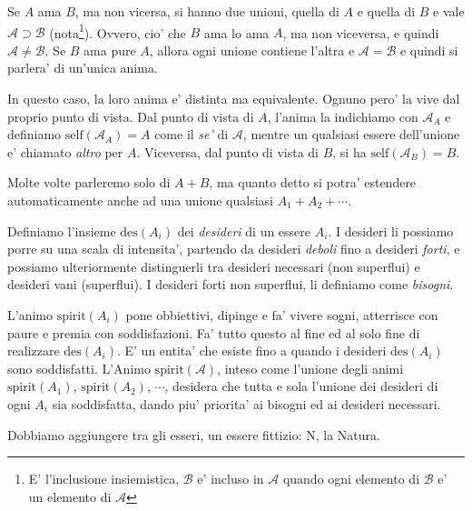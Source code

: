 Se $A$ ama $B$, ma non vicersa, si hanno due unioni, quella di $A$ e quella di $B$ e vale $\mathcal{A} \supset \mathcal{B}$ (nota\footnote{E' l'inclusione insiemistica, $\mathcal{B}$ e' incluso in $\mathcal{A}$ quando ogni elemento di $\mathcal{B}$ e' un elemento di $\mathcal{A}$}).  Ovvero, cio' che $B$ ama lo ama $A$, ma non viceversa, e quindi $\mathcal{A} \neq \mathcal{B}$. Se $B$ ama pure $A$, allora ogni unione contiene l'altra e $\mathcal{A} = \mathcal{B}$ e quindi si parlera' di un'unica anima. 

In questo caso, la loro anima e' distinta ma equivalente.  Ognuno pero' la vive dal proprio punto di vista. Dal punto di vista di $A$, l'anima la indichiamo con $\mathcal{A}_A$ e definiamo $\textrm{self}(\mathcal{A}_A)=A$ come il \emph{se'} di $\mathcal{A}$, mentre un qualsiasi essere dell'unione e' chiamato \emph{altro} per $A$. Viceversa, dal punto di vista di $B$, si ha $\textrm{self}(\mathcal{A}_B)=B$.

Molte volte parleremo solo di $A+B$, ma quanto detto si potra' estendere automaticamente anche ad una unione qualsiasi $A_1+A_2+\cdots$. \\

\def\des{\textrm{des}}
\label{defDiDesideriDes}

Definiamo l'insieme $\des(A_i)$ dei \emph{desideri} di un essere $A_i$. I desideri li possiamo porre su una scala di intensita', partendo da desideri \emph{deboli} fino a desideri \emph{forti}, e possiamo ulteriormente distinguerli tra desideri necessari (non superflui) e desideri vani (superflui). I desideri forti non superflui, li definiamo come \emph{bisogni}.

\def\anima#1{\mathcal{#1}}

\def\spirit#1{\textrm{spirit}(#1)}
\def\Animo#1{\spirit{\anima{#1}}}

L'animo $\spirit{A_i}$ pone obbiettivi, dipinge e fa' vivere sogni, atterrisce con paure e premia con soddisfazioni. Fa' tutto questo al fine ed al solo fine di realizzare $\des(A_i)$. E' un entita' che esiste fino a quando i desideri $\des(A_i)$ sono soddisfatti. L'Animo $\Animo{A}$, inteso come l'unione degli animi $\spirit{A_1}$, $\spirit{A_2}$, $\cdots$,  desidera che tutta e sola l'unione dei desideri di ogni $A_i$ sia soddisfatta, dando piu' priorita' ai bisogni ed ai desideri necessari.

Dobbiamo aggiungere tra gli esseri, un essere fittizio: N, la Natura.

